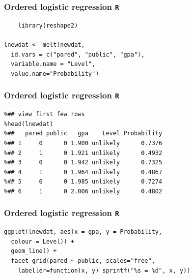 \documentclass[00-GLMregslides.tex]{subfiles}
\begin{document}
\begin{frame}[fragile]
\frametitle{Ordered logistic regression \texttt{R} }
\normalsize
\large
\begin{framed}
	\begin{verbatim}
	library(reshape2)
	
lnewdat <- melt(newdat, 
  id.vars = c("pared", "public", "gpa"),
  variable.name = "Level", 
  value.name="Probability")
\end{verbatim}
\end{framed}
\end{frame}
\begin{frame}[fragile]
	\frametitle{Ordered logistic regression \texttt{R} }
	\large
	\begin{framed}
		\begin{verbatim}
%## view first few rows
%head(lnewdat)
%##   pared public   gpa    Level Probability
%## 1     0      0 1.900 unlikely      0.7376
%## 2     1      0 1.921 unlikely      0.4932
%## 3     0      0 1.942 unlikely      0.7325
%## 4     1      0 1.964 unlikely      0.4867
%## 5     0      0 1.985 unlikely      0.7274
%## 6     1      0 2.006 unlikely      0.4802
\end{verbatim}
\end{framed}
\end{frame}
\begin{frame}[fragile]
	\frametitle{Ordered logistic regression \texttt{R} }
\large
\begin{framed}
\begin{verbatim}
ggplot(lnewdat, aes(x = gpa, y = Probability, 
  colour = Level)) +
  geom_line() +
  facet_grid(pared ~ public, scales="free",
    labeller=function(x, y) sprintf("%s = %d", x, y))
    
\end{verbatim}
\end{framed}
\end{frame}
\end{document}
